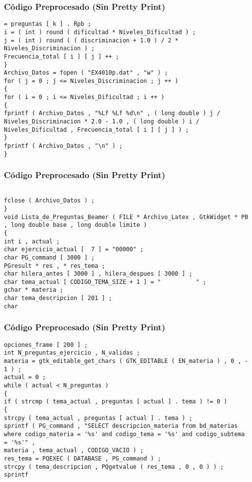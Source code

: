 \documentclass{beamer}
\begin{document}
\begin{frame}[fragile]
\frametitle{C\'odigo Preprocesado (Sin Pretty Print)}
\begin{lstlisting}[style=CStyle]
= preguntas [ k ] . Rpb ; 
i = ( int ) round ( dificultad * Niveles_Dificultad ) ; 
j = ( int ) round ( ( discriminacion + 1.0 ) / 2 * Niveles_Discriminacion ) ; 
Frecuencia_total [ i ] [ j ] ++ ; 
} 
Archivo_Datos = fopen ( "EX4010p.dat" , "w" ) ; 
for ( j = 0 ; j <= Niveles_Discriminacion ; j ++ ) 
{ 
for ( i = 0 ; i <= Niveles_Dificultad ; i ++ ) 
{ 
fprintf ( Archivo_Datos , "%Lf %Lf %d\n" , ( long double ) j / Niveles_Discriminacion * 2.0 - 1.0 , ( long double ) i / Niveles_Dificultad , Frecuencia_total [ i ] [ j ] ) ; 
} 
fprintf ( Archivo_Datos , "\n" ) ; 
} \end{lstlisting}
\end{frame}
\begin{frame}[fragile]
\frametitle{C\'odigo Preprocesado (Sin Pretty Print)}
\begin{lstlisting}[style=CStyle]

fclose ( Archivo_Datos ) ; 
} 
void Lista_de_Preguntas_Beamer ( FILE * Archivo_Latex , GtkWidget * PB , long double base , long double limite ) 
{ 
int i , actual ; 
char ejercicio_actual [  7 ] = "00000" ; 
char PG_command [ 3000 ] ; 
PGresult * res , * res_tema ; 
char hilera_antes [ 3000 ] , hilera_despues [ 3000 ] ; 
char tema_actual [ CODIGO_TEMA_SIZE + 1 ] = "          " ; 
gchar * materia ; 
char tema_descripcion [ 201 ] ; 
char \end{lstlisting}
\end{frame}
\begin{frame}[fragile]
\frametitle{C\'odigo Preprocesado (Sin Pretty Print)}
\begin{lstlisting}[style=CStyle]
opciones_frame [ 200 ] ; 
int N_preguntas_ejercicio , N_validas ; 
materia = gtk_editable_get_chars ( GTK_EDITABLE ( EN_materia ) , 0 , - 1 ) ; 
actual = 0 ; 
while ( actual < N_preguntas ) 
{ 
if ( strcmp ( tema_actual , preguntas [ actual ] . tema ) != 0 ) 
{ 
strcpy ( tema_actual , preguntas [ actual ] . tema ) ; 
sprintf ( PG_command , "SELECT descripcion_materia from bd_materias where codigo_materia = '%s' and codigo_tema = '%s' and codigo_subtema = '%s'" , 
materia , tema_actual , CODIGO_VACIO ) ; 
res_tema = PQEXEC ( DATABASE , PG_command ) ; 
strcpy ( tema_descripcion , PQgetvalue ( res_tema , 0 , 0 ) ) ; 
sprintf \end{lstlisting}
\end{frame}
\end{document}

